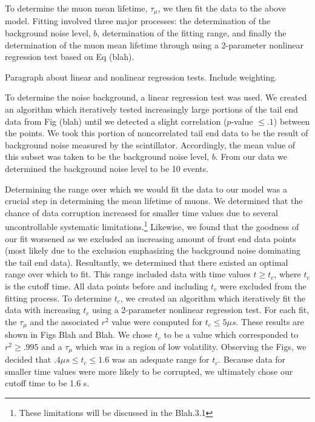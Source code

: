 To determine the muon mean lifetime, $\tau_{\mu}$, we then fit the data to the above model.  Fitting involved three major processes: the determination of the background noise level, $b$, determination of the fitting range, and finally the determination of the muon mean lifetime through using a 2-parameter nonlinear regression test based on Eq (blah).  

Paragraph about linear and nonlinear regression tests. Include weighting.

To determine the noise background, a linear regression test was used.  We created an algorithm which iteratively tested increasingly large portions of the tail end data from Fig (blah) until we detected a slight correlation ($p$-value $\leq .1$) between the points.  We took this portion of noncorrelated tail end data to be the result of background noise measured by the scintillator.  Accordingly, the mean value of this subset was taken to be the background noise level, $b$. From our data we determined the background noise level to be 10 events. 

Determining the range over which we would fit the data to our model was a crucial step in determining the mean lifetime of muons.  We determined that the chance of data corruption increased for smaller time values due to several uncontrollable systematic limitations.\footnote{These limitations will be discussed in the Blah.3.1}  Likewise, we found that the goodness of our fit worsened as we excluded an increasing amount of front end data points (most likely due to the exclusion emphasizing the background noise dominating the tail end data).  Resultantly, we determined that there existed an optimal range over which to fit.  This range included data with time values $t \geq t_{c}$, where $t_{c}$ is the cutoff time.  All data points before and including $t_{c}$ were excluded from the fitting process.  To determine $t_{c}$, we created an algorithm which iteratively fit the data with increasing $t_{c}$ using a 2-parameter nonlinear regression test.  For each fit, the $\tau_{\mu}$ and the associated $r^{2}$ value were computed for $t_{c}\leq 5\mu s$.  These results are shown in Figs Blah and Blah.  We chose $t_{c}$ to be a value which corresponded to $r^{2} \geq .995$ and a $\tau_{\mu}$ which was in a region of low volatility.  Observing the Figs, we decided that ${.4\mu s \leq t_{c}\leq1.6}$ was an adequate range for $t_{c}$.  Because data for smaller time values were more likely to be corrupted, we ultimately chose our cutoff time to be 1.6 \mu s.  

